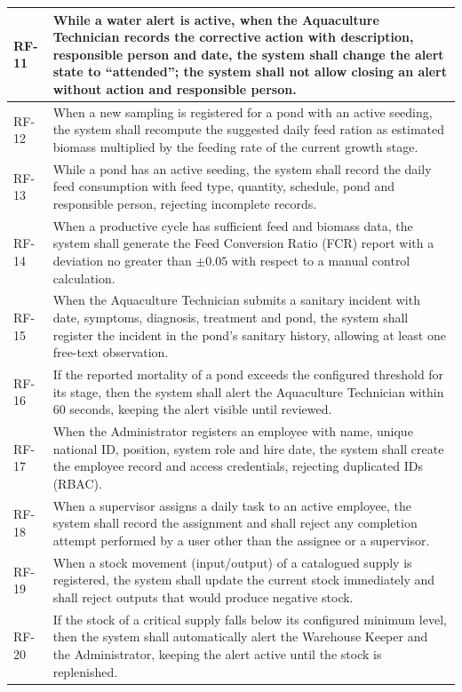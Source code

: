 \documentclass[11pt,a4paper]{article}
\renewcommand{\_}{\textunderscore\allowbreak}
\begin{document}
\begin{longtable}{|p{1.3cm}|p{13.2cm}|}
\hline
RF-11 & While a water alert is active, when the Aquaculture Technician records the corrective action with description, responsible person and date, the system shall change the alert state to ``attended''; the system shall not allow closing an alert without action and responsible person.\\
\hline
RF-12 & When a new sampling is registered for a pond with an active seeding, the system shall recompute the suggested daily feed ration as estimated biomass multiplied by the feeding rate of the current growth stage.\\
\hline
RF-13 & While a pond has an active seeding, the system shall record the daily feed consumption with feed type, quantity, schedule, pond and responsible person, rejecting incomplete records.\\
\hline
RF-14 & When a productive cycle has sufficient feed and biomass data, the system shall generate the Feed Conversion Ratio (FCR) report with a deviation no greater than $\pm0.05$ with respect to a manual control calculation.\\
\hline
RF-15 & When the Aquaculture Technician submits a sanitary incident with date, symptoms, diagnosis, treatment and pond, the system shall register the incident in the pond's sanitary history, allowing at least one free-text observation.\\
\hline
RF-16 & If the reported mortality of a pond exceeds the configured threshold for its stage, then the system shall alert the Aquaculture Technician within 60 seconds, keeping the alert visible until reviewed.\\
\hline
RF-17 & When the Administrator registers an employee with name, unique national ID, position, system role and hire date, the system shall create the employee record and access credentials, rejecting duplicated IDs (RBAC).\\
\hline
RF-18 & When a supervisor assigns a daily task to an active employee, the system shall record the assignment and shall reject any completion attempt performed by a user other than the assignee or a supervisor.\\
\hline
RF-19 & When a stock movement (input/output) of a catalogued supply is registered, the system shall update the current stock immediately and shall reject outputs that would produce negative stock.\\
\hline
RF-20 & If the stock of a critical supply falls below its configured minimum level, then the system shall automatically alert the Warehouse Keeper and the Administrator, keeping the alert active until the stock is replenished.\\

\end{longtable}
\end{document}
